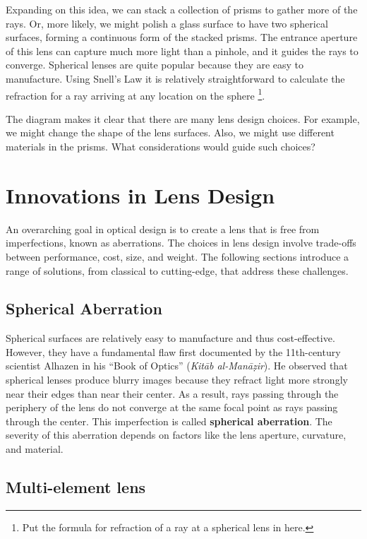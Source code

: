 \documentclass[
  letterpaper,
]{book}
\begin{document}
Expanding on this idea, we can stack a collection of prisms to gather
more of the rays. Or, more likely, we might polish a glass surface to
have two spherical surfaces, forming a continuous form of the stacked
prisms. The entrance aperture of this lens can capture much more light
than a pinhole, and it guides the rays to converge. Spherical lenses are
quite popular because they are easy to manufacture. Using Snell's Law it
is relatively straightforward to calculate the refraction for a ray
arriving at any location on the sphere \footnote{Put the formula for
  refraction of a ray at a spherical lens in here.}.

The diagram makes it clear that there are many lens design choices. For
example, we might change the shape of the lens surfaces. Also, we might
use different materials in the prisms. What considerations would guide
such choices?

\section{Innovations in Lens Design}\label{innovations-in-lens-design}

An overarching goal in optical design is to create a lens that is free
from imperfections, known as aberrations. The choices in lens design
involve trade-offs between performance, cost, size, and weight. The
following sections introduce a range of solutions, from classical to
cutting-edge, that address these challenges.

\subsection{Spherical Aberration}\label{spherical-aberration}

Spherical surfaces are relatively easy to manufacture and thus
cost-effective. However, they have a fundamental flaw first documented
by the 11th-century scientist Alhazen in his ``Book of Optics''
(\emph{Kitāb al-Manāẓir}). He observed that spherical lenses produce
blurry images because they refract light more strongly near their edges
than near their center. As a result, rays passing through the periphery
of the lens do not converge at the same focal point as rays passing
through the center. This imperfection is called \textbf{spherical
aberration}. The severity of this aberration depends on factors like the
lens aperture, curvature, and material.

\subsection{Multi-element lens}\label{multi-element-lens}
\end{document}
